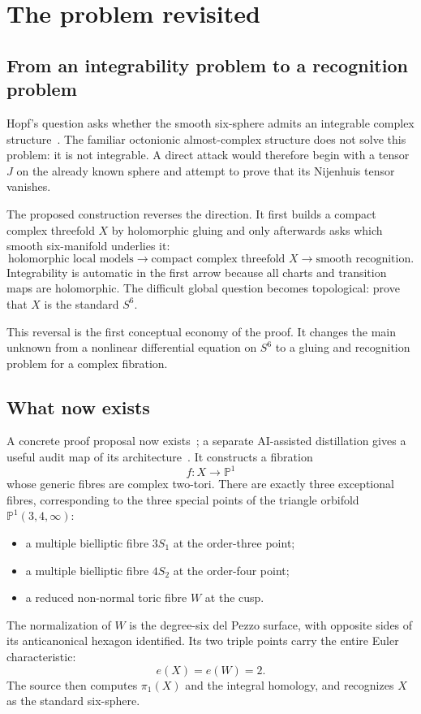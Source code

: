 \documentclass[11pt,reqno]{amsart}
\numberwithin{equation}{section}
\newcommand{\Pone}{\mathbb P^1}
\theoremstyle{definition}
\begin{document}
\section{The problem revisited}\label{sec:problem}

\subsection{From an integrability problem to a recognition problem}

Hopf's question asks whether the smooth six-sphere admits an integrable complex structure~\cite{Hopf}. The familiar octonionic almost-complex structure does not solve this problem: it is not integrable. A direct attack would therefore begin with a tensor $J$ on the already known sphere and attempt to prove that its Nijenhuis tensor vanishes.

The proposed construction reverses the direction. It first builds a compact complex threefold $X$ by holomorphic gluing and only afterwards asks which smooth six-manifold underlies it:
\[
\text{holomorphic local models}
\longrightarrow
\text{compact complex threefold }X
\longrightarrow
\text{smooth recognition}.
\]
Integrability is automatic in the first arrow because all charts and transition maps are holomorphic. The difficult global question becomes topological: prove that $X$ is the standard $S^6$.

This reversal is the first conceptual economy of the proof. It changes the main unknown from a nonlinear differential equation on $S^6$ to a gluing and recognition problem for a complex fibration.

\subsection{What now exists}

A concrete proof proposal now exists~\cite{S6}; a separate AI-assisted distillation gives a useful audit map of its architecture~\cite{Feng}. It constructs a fibration
\[
 f:X\longrightarrow \Pone
\]
whose generic fibres are complex two-tori. There are exactly three exceptional fibres, corresponding to the three special points of the triangle orbifold $\Pone(3,4,\infty)$:
\begin{itemize}
\item a multiple bielliptic fibre $3S_1$ at the order-three point;
\item a multiple bielliptic fibre $4S_2$ at the order-four point;
\item a reduced non-normal toric fibre $W$ at the cusp.
\end{itemize}
The normalization of $W$ is the degree-six del Pezzo surface, with opposite sides of its anticanonical hexagon identified. Its two triple points carry the entire Euler characteristic:
\[
 e(X)=e(W)=2.
\]
The source then computes $\pi_1(X)$ and the integral homology, and recognizes $X$ as the standard six-sphere.
\end{document}
